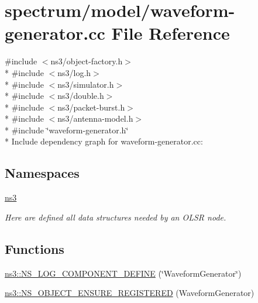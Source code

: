 \hypertarget{waveform-generator_8cc}{}\section{spectrum/model/waveform-\/generator.cc File Reference}
\label{waveform-generator_8cc}
{\ttfamily \#include $<$ns3/object-\/factory.\+h$>$}\\*
{\ttfamily \#include $<$ns3/log.\+h$>$}\\*
{\ttfamily \#include $<$ns3/simulator.\+h$>$}\\*
{\ttfamily \#include $<$ns3/double.\+h$>$}\\*
{\ttfamily \#include $<$ns3/packet-\/burst.\+h$>$}\\*
{\ttfamily \#include $<$ns3/antenna-\/model.\+h$>$}\\*
{\ttfamily \#include \char`\"{}waveform-\/generator.\+h\char`\"{}}\\*
Include dependency graph for waveform-\/generator.cc\+:
\subsection*{Namespaces}
\begin{DoxyCompactItemize}
\item 
 \hyperlink{namespacens3}{ns3}
\begin{DoxyCompactList}\small\item\em Here are defined all data structures needed by an O\+L\+SR node. \end{DoxyCompactList}\end{DoxyCompactItemize}
\subsection*{Functions}
\begin{DoxyCompactItemize}
\item 
\hyperlink{namespacens3_a6d81086c3c870564488b1dfe19751977}{ns3\+::\+N\+S\+\_\+\+L\+O\+G\+\_\+\+C\+O\+M\+P\+O\+N\+E\+N\+T\+\_\+\+D\+E\+F\+I\+NE} (\char`\"{}Waveform\+Generator\char`\"{})
\item 
\hyperlink{namespacens3_aaeab8e3c795fa2f860a5f59ad2914738}{ns3\+::\+N\+S\+\_\+\+O\+B\+J\+E\+C\+T\+\_\+\+E\+N\+S\+U\+R\+E\+\_\+\+R\+E\+G\+I\+S\+T\+E\+R\+ED} (Waveform\+Generator)
\end{DoxyCompactItemize}
